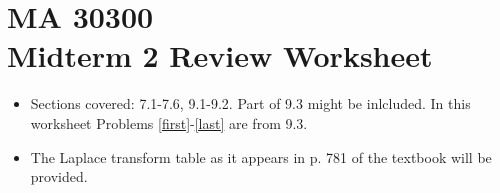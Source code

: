\documentclass[11 pt]{article}
\title{}
\author{Nikolas Eptaminitakis}
\begin{document}
\section*{MA 30300 \\Midterm 2 Review Worksheet}

\begin{itemize}
    \item  Sections covered: 7.1-7.6, 9.1-9.2. Part of 9.3 might be inlcluded. In this worksheet Problems \ref{first}-\ref{last} are from 9.3.



 \item  The Laplace transform table as it appears in p. 781 of the textbook will be provided.


\end{itemize}
\end{document}
